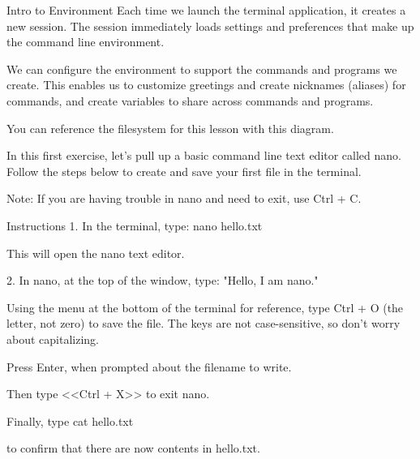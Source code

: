 Intro to Environment
    Each time we launch the terminal application, it creates a new session. The session immediately loads settings and preferences that make up the command line environment.

    We can configure the environment to support the commands and programs we create. This enables us to customize greetings and create nicknames (aliases) for commands, and create variables to share across commands and programs.

    You can reference the filesystem for this lesson with this diagram.

    In this first exercise, let’s pull up a basic command line text editor called nano. Follow the steps below to create and save your first file in the terminal.

    Note: If you are having trouble in nano and need to exit, use Ctrl + C.

Instructions
    1.
    In the terminal, type:
        nano hello.txt 
    
    This will open the nano text editor.

    2.
    In nano, at the top of the window, type:
        "Hello, I am nano." 
    
    Using the menu at the bottom of the terminal for reference, type Ctrl + O (the letter, not zero) to save the file. The keys are not case-sensitive, so don’t worry about capitalizing.

    Press Enter, when prompted about the filename to write.

    Then type <<Ctrl + X>> to exit nano.

    Finally, type
        cat hello.txt
    
    to confirm that there are now contents in hello.txt.